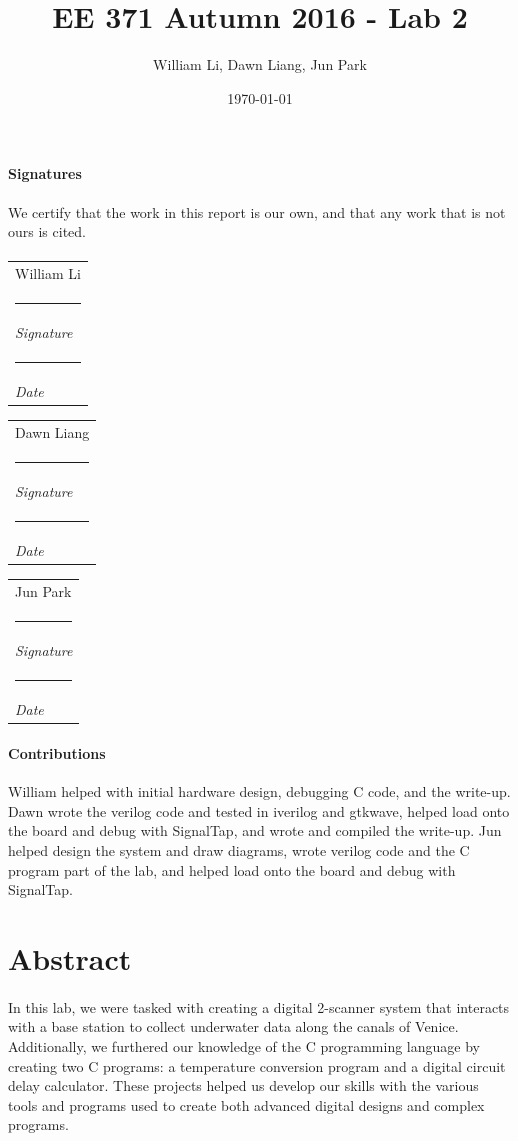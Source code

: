 \documentclass{article}
\title{EE 371 Autumn 2016 - Lab 2}
\date{\today}
\author{William Li, Dawn Liang, Jun Park}
\begin{document}
\newcommand{\namesigdate}[2][5cm]{
  \begin{tabular}{@{}p{#1}@{}}
    #2 \\[2\normalbaselineskip] \hrule \\[0pt]
    {\small \textit{Signature}} \\[2\normalbaselineskip] \hrule \\[0pt]
    {\small \textit{Date}}
  \end{tabular}
}

\maketitle
\newpage

\paragraph{Signatures} We certify that the work in this report is our own, and that any work that is not ours is cited.
\paragraph{} \noindent \namesigdate{William Li} \hfill \namesigdate{Dawn Liang} \hfill \namesigdate{Jun Park}

\paragraph{Contributions} William helped with initial hardware design, debugging C code, and the write-up. Dawn wrote the verilog code and tested in iverilog and gtkwave, helped load onto the board and debug with SignalTap, and wrote and compiled the write-up. Jun helped design the system and draw diagrams, wrote verilog code and the C program part of the lab, and helped load onto the board and debug with SignalTap.

\newpage

\tableofcontents
\newpage


\section{Abstract}
\paragraph{} In this lab, we were tasked with creating a digital 2-scanner system that interacts with a base station to collect underwater data along the canals of Venice. Additionally, we furthered our knowledge of the C programming language by creating two C programs: a temperature conversion program and a digital circuit delay calculator. These projects helped us develop our skills with the various tools and programs used to create both advanced digital designs and complex programs.
\end{document}
